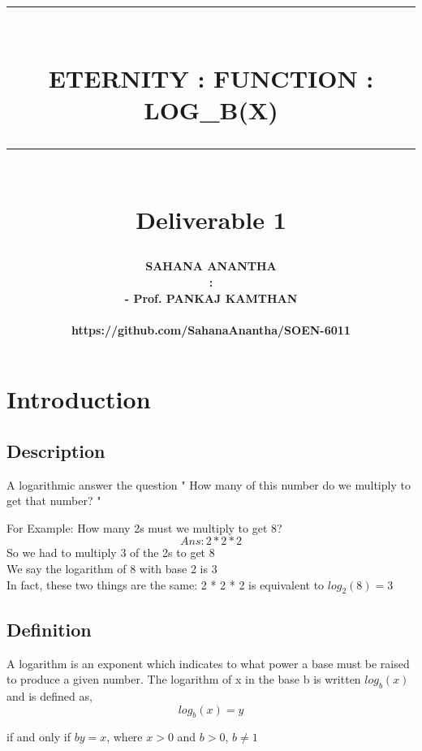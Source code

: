 \documentclass[12pt]{report}
\newcommand{\HRule}[1]{\rule{\linewidth}{#1}}
\begin{document}
\title{ \Large {}
		\\ [2.0cm]
		\HRule{2pt} \\ [0.5cm]
		\LARGE \textbf{\uppercase{ETERNITY : function : log_{b}(x)}}\\
		\HRule{2pt} \\ [0.5cm]
		\textbf{{\Large Deliverable 1}}\\
		\normalsize  \vspace*{5\baselineskip}}

\date{}
\author{\LARGE \textbf{
		SAHANA ANANTHA \\
		\Large {} : \\
        \Large {} - Prof. PANKAJ KAMTHAN  \\
\Large {}\\
\small \text  https://github.com/SahanaAnantha/SOEN-6011 \\}}

\maketitle

\newpage
\tableofcontents
\pagebreak
\renewcommand{\thesection}{\arabic{section}}

\section{Introduction}
\subsection{Description}

A logarithmic answer the question " How many of this number do we multiply to get that number? " 

    For Example:  How many 2s must we multiply to get 8?\\
    $$Ans: 2 * 2 * 2$$
    So we had to multiply 3 of the 2s to get 8 \\We say the logarithm of 8 with base 2 is 3 \\
    In fact, these two things are the same:
		2 * 2 * 2  is equivalent to $log_2 (8) = 3$

\subsection{Definition}
A logarithm is an exponent which indicates to what power a base must be raised to produce a given number.
The logarithm of x in the base b is written $log_b (x)$ and is defined as,
$$log_b (x) = y$$
\begin{center}
if and only if $by = x$, where $x > 0$ and $b > 0$, $b\neq1$
\end{center}
\end{document}
